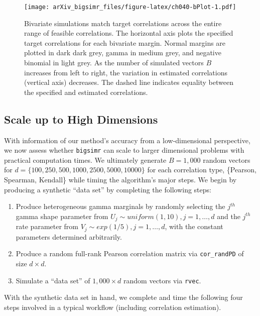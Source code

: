 \documentclass{article}
\begin{document}
\begin{figure}
\centering
\texttt{[image: arXiv\_bigsimr\_files/figure-latex/ch040-bPlot-1.pdf]}
\caption{\label{fig:ch040-bPlot}Bivariate simulations match target
correlations across the entire range of feasible correlations. The
horizontal axis plots the specified target correlations for each
bivariate margin. Normal margins are plotted in dark dark grey, gamma in
medium grey, and negative binomial in light grey. As the number of
simulated vectors \(B\) increases from left to right, the variation in
estimated correlations (vertical axis) decreases. The dashed line
indicates equality between the specified and estimated correlations.}
\end{figure}

\hypertarget{scale-up-to-high-dimensions}{%
\subsection{Scale up to High
Dimensions}\label{scale-up-to-high-dimensions}}

With information of our method's accuracy from a low-dimensional
perspective, we now assess whether \texttt{bigsimr} can scale to larger
dimensional problems with practical computation times. We ultimately
generate \(B=1,000\) random vectors for
\(d=\{100, 250, 500, 1000, 2500, 5000, 10000\}\) for each correlation
type, \{Pearson, Spearman, Kendall\} while timing the algorithm's major
steps. We begin by producing a synthetic ``data set'' by completing the
following steps:

\begin{enumerate}
\def\labelenumi{\arabic{enumi}.}
\tightlist
\item
  Produce heterogeneous gamma marginals by randomly selecting the
  \(j^{th}\) gamma shape parameter from
  \(U_j \sim uniform(1,10), j=1,\ldots,d\) and the \(j^{th}\) rate
  parameter from \(V_j \sim exp(1/5), j=1,\ldots,d\), with the constant
  parameters determined arbitrarily.
\item
  Produce a random full-rank Pearson correlation matrix via
  \texttt{cor\_randPD} of size \(d \times d\).
\item
  Simulate a ``data set'' of \(1,000 \times d\) random vectors via
  \texttt{rvec}.
\end{enumerate}

With the synthetic data set in hand, we complete and time the following
four steps involved in a typical workflow (including correlation
estimation).
\end{document}
